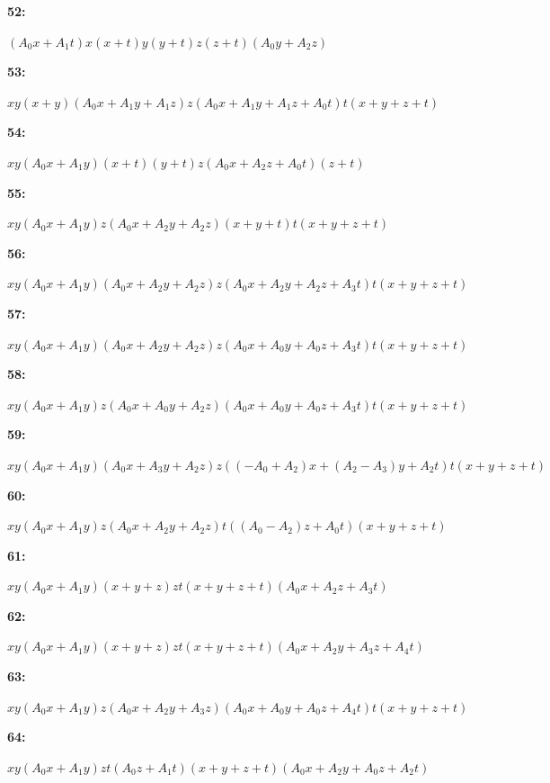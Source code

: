 \documentclass[12pt]{amsart}
\theoremstyle{plain}
\theoremstyle{remark}
\theoremstyle{definition}
\numberwithin{table}{section}
\begin{document}
\noindent\parbox[right]{9mm}{\textbf{52:}}\parbox{3mm}{\hfill}%
\parbox[t]{15cm}{\((A_{0}x + A_{1}t)x(x + t)y(y + t)z(z + t)(A_{0}y + A_{2}z)\)}

\noindent\parbox[right]{9mm}{\textbf{53:}}\parbox{3mm}{\hfill}%
\parbox[t]{15cm}{\(xy(x + y)(A_{0}x + A_{1}y + A_{1}z)z(A_{0}x + A_{1}y + A_{1}z + A_{0}t)t(x + y + z + t)\)}

\noindent\parbox[right]{9mm}{\textbf{54:}}\parbox{3mm}{\hfill}%
\parbox[t]{15cm}{\(xy(A_{0}x + A_{1}y)(x + t)(y + t)z(A_{0}x + A_{2}z + A_{0}t)(z + t)\)}

\noindent\parbox[right]{9mm}{\textbf{55:}}\parbox{3mm}{\hfill}%
\parbox[t]{15cm}{\(xy(A_{0}x + A_{1}y)z(A_{0}x + A_{2}y + A_{2}z)(x + y + t)t(x + y + z + t)\)}

\noindent\parbox[right]{9mm}{\textbf{56:}}\parbox{3mm}{\hfill}%
\parbox[t]{15cm}{\(xy(A_{0}x + A_{1}y)(A_{0}x + A_{2}y + A_{2}z)z(A_{0}x + A_{2}y + A_{2}z + A_{3}t)t(x + y + z + t)\)}

\noindent\parbox[right]{9mm}{\textbf{57:}}\parbox{3mm}{\hfill}%
\parbox[t]{15cm}{\(xy(A_{0}x + A_{1}y)(A_{0}x + A_{2}y + A_{2}z)z(A_{0}x + A_{0}y + A_{0}z + A_{3}t)t(x + y + z + t)\)}

\noindent\parbox[right]{9mm}{\textbf{58:}}\parbox{3mm}{\hfill}%
\parbox[t]{15cm}{\(xy(A_{0}x + A_{1}y)z(A_{0}x + A_{0}y + A_{2}z)(A_{0}x + A_{0}y + A_{0}z + A_{3}t)t(x + y + z + t)\)}

\noindent\parbox[right]{9mm}{\textbf{59:}}\parbox{3mm}{\hfill}%
\parbox[t]{15cm}{\(xy(A_{0}x + A_{1}y)(A_{0}x + A_{3}y + A_{2}z)z((-A_{0} + A_{2})x + (A_{2} - A_{3})y + A_{2}t)t(x + y + z + t)\)}

\noindent\parbox[right]{9mm}{\textbf{60:}}\parbox{3mm}{\hfill}%
\parbox[t]{15cm}{\(xy(A_{0}x + A_{1}y)z(A_{0}x + A_{2}y + A_{2}z)t((A_{0} - A_{2})z + A_{0}t)(x + y + z + t)\)}

\noindent\parbox[right]{9mm}{\textbf{61:}}\parbox{3mm}{\hfill}%
\parbox[t]{15cm}{\(xy(A_{0}x + A_{1}y)(x + y + z)zt(x + y + z + t)(A_{0}x + A_{2}z + A_{3}t)\)}

\noindent\parbox[right]{9mm}{\textbf{62:}}\parbox{3mm}{\hfill}%
\parbox[t]{15cm}{\(xy(A_{0}x + A_{1}y)(x + y + z)zt(x + y + z + t)(A_{0}x + A_{2}y + A_{3}z + A_{4}t)\)}

\noindent\parbox[right]{9mm}{\textbf{63:}}\parbox{3mm}{\hfill}%
\parbox[t]{15cm}{\(xy(A_{0}x + A_{1}y)z(A_{0}x + A_{2}y + A_{3}z)(A_{0}x + A_{0}y + A_{0}z + A_{4}t)t(x + y + z + t)\)}

\noindent\parbox[right]{9mm}{\textbf{64:}}\parbox{3mm}{\hfill}%
\parbox[t]{15cm}{\(xy(A_{0}x + A_{1}y)zt(A_{0}z + A_{1}t)(x + y + z + t)(A_{0}x + A_{2}y + A_{0}z + A_{2}t)\)}
\end{document}

